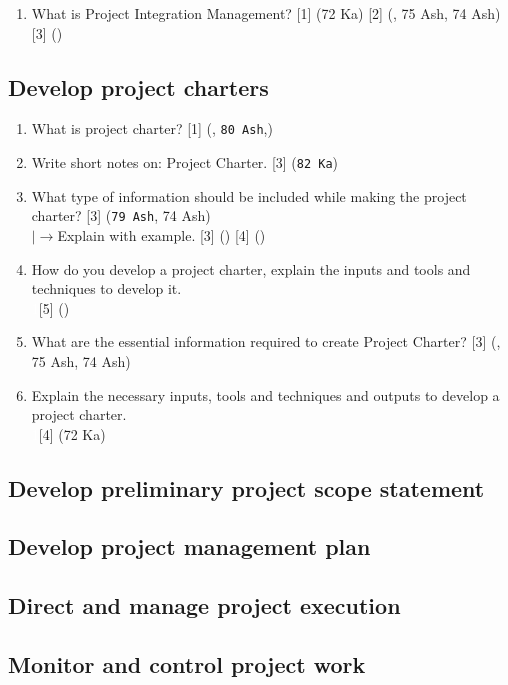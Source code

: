 \documentclass[12pt]{article}
\newcommand{\lb}{\\$\left|\rightarrow\right.$}
\newcommand{\enter}{\\\textcolor{white}{1}}
\begin{document}
  \begin{enumerate}
    \item What is Project Integration Management? \hfill [1] (72 Ka) [2] (, 75 Ash, 74 Ash) [3] () 
  \end{enumerate}

  \subsection{Develop project charters}
    \begin{enumerate}
      \item What is project charter? \hfill [1] (, \texttt{80 Ash},)

      \item Write short notes on: Project Charter. \hfill [3] (\texttt{82 Ka})
      
      \item What type of information should be included while making the project charter? \hfill [3] (\texttt{79 Ash}, 74 Ash)
        \lb Explain with example. \hfill [3] () [4] ()

      \item How do you develop a project charter, explain the inputs and tools and techniques to develop it.
        \enter\hfill [5] ()

      \item What are the essential information required to create Project Charter? \hfill [3] (, 75 Ash, 74 Ash)

      \item Explain the necessary inputs, tools and techniques and outputs to develop a project charter.
        \enter\hfill [4] (72 Ka)
    \end{enumerate}

  \subsection{Develop preliminary project scope statement}
  \subsection{Develop project management plan}
  \subsection{Direct and manage project execution}
  \subsection{Monitor and control project work}
\end{document}
